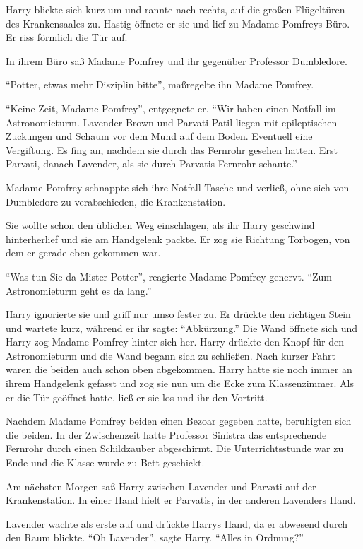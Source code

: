 Harry blickte sich kurz um und rannte nach rechts, auf die großen Flügeltüren des Krankensaales zu. Hastig öffnete er sie und lief zu Madame Pomfreys Büro. Er riss förmlich die Tür auf.

In ihrem Büro saß Madame Pomfrey und ihr gegenüber Professor Dumbledore.

\enquote{Potter, etwas mehr Disziplin bitte}, maßregelte ihn Madame Pomfrey.

\enquote{Keine Zeit, Madame Pomfrey}, entgegnete er. \enquote{Wir haben einen Notfall im Astronomieturm. Lavender Brown und Parvati Patil liegen mit epileptischen Zuckungen und Schaum vor dem Mund auf dem Boden. Eventuell eine Vergiftung. Es fing an, nachdem sie durch das Fernrohr gesehen hatten. Erst Parvati, danach Lavender, als sie durch Parvatis Fernrohr schaute.}

Madame Pomfrey schnappte sich ihre Notfall-Tasche und verließ, ohne sich von Dumbledore zu verabschieden, die Krankenstation.

Sie wollte schon den üblichen Weg einschlagen, als ihr Harry geschwind hinterherlief und sie am Handgelenk packte. Er zog sie Richtung Torbogen, von dem er gerade eben gekommen war.

\enquote{Was tun Sie da Mister Potter}, reagierte Madame Pomfrey genervt. \enquote{Zum Astronomieturm geht es da lang.}

Harry ignorierte sie und griff nur umso fester zu. Er drückte den richtigen Stein und wartete kurz, während er ihr sagte: \enquote{Abkürzung.} Die Wand öffnete sich und Harry zog Madame Pomfrey hinter sich her. Harry drückte den Knopf für den Astronomieturm und die Wand begann sich zu schließen. Nach kurzer Fahrt waren die beiden auch schon oben abgekommen. Harry hatte sie noch immer an ihrem Handgelenk gefasst und zog sie nun um die Ecke zum Klassenzimmer. Als er die Tür geöffnet hatte, ließ er sie los und ihr den Vortritt.

Nachdem Madame Pomfrey beiden einen Bezoar gegeben hatte, beruhigten sich die beiden. In der Zwischenzeit hatte Professor Sinistra das entsprechende Fernrohr durch einen Schildzauber abgeschirmt. Die Unterrichtsstunde war zu Ende und die Klasse wurde zu Bett geschickt.

Am nächsten Morgen saß Harry zwischen Lavender und Parvati auf der Krankenstation. In einer Hand hielt er Parvatis, in der anderen Lavenders Hand.

Lavender wachte als erste auf und drückte Harrys Hand, da er abwesend durch den Raum blickte. \enquote{Oh Lavender}, sagte Harry. \enquote{Alles in Ordnung?}

